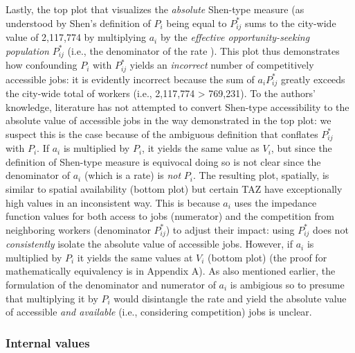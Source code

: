 \documentclass[]{elsarticle} %
\begin{document}
Lastly, the top plot that visualizes the \emph{absolute} Shen-type
measure (as understood by Shen's definition of \(P_i\) being equal to
\(P_{ij}^*\) sums to the city-wide value of 2,117,774 by multiplying
\(a_i\) by the \emph{effective opportunity-seeking population}
\(P_{ij}^*\) (i.e., the denominator of the rate ). This plot thus
demonstrates how confounding \(P_i\) with \(P_{ij}^*\) yields an
\emph{incorrect} number of competitively accessible jobs: it is
evidently incorrect because the sum of \(a_iP_{ij}^*\) greatly exceeds
the city-wide total of workers (i.e., 2,117,774 \textgreater{} 769,231).
To the authors' knowledge, literature has not attempted to convert
Shen-type accessibility to the absolute value of accessible jobs in the
way demonstrated in the top plot: we suspect this is the case because of
the ambiguous definition that conflates \(P_{ij}^*\) with \(P_i\). If
\(a_i\) is multiplied by \(P_i\), it yields the same value as \(V_i\),
but since the definition of Shen-type measure is equivocal doing so is
not clear since the denominator of \(a_i\) (which is a rate) is
\emph{not} \(P_i\). The resulting plot, spatially, is similar to spatial
availability (bottom plot) but certain TAZ have exceptionally high
values in an inconsistent way. This is because \(a_i\) uses the
impedance function values for both access to jobs (numerator) and the
competition from neighboring workers (denominator \(P_{ij}^*\)) to
adjust their impact: using \(P_{ij}^*\) does not \emph{consistently}
isolate the absolute value of accessible jobs. However, if \(a_i\) is
multiplied by \(P_i\) it yields the same values at \(V_i\) (bottom plot)
(the proof for mathematically equivalency is in Appendix A). As also
mentioned earlier, the formulation of the denominator and numerator of
\(a_i\) is ambigious so to presume that multiplying it by \(P_i\) would
disintangle the rate and yield the absolute value of accessible
\emph{and available} (i.e., considering competition) jobs is unclear.

\hypertarget{internal-values}{%
\subsubsection{Internal values}\label{internal-values}}
\end{document}
